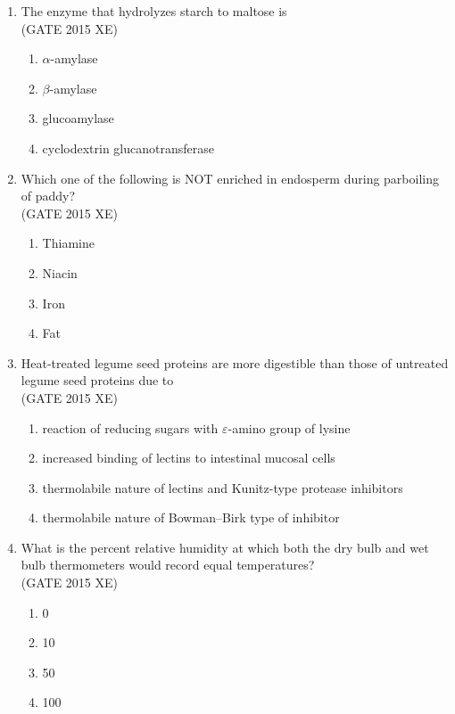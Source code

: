 \documentclass[journal,12pt,onecolumn]{IEEEtran}
\begin{document}
\begin{enumerate}
\item The enzyme that hydrolyzes starch to maltose is\\
\hfill{(GATE 2015 XE)} 
\begin{multicols}{4}
\begin{enumerate}
\item $\alpha$-amylase
\item $\beta$-amylase
\item glucoamylase
\item cyclodextrin glucanotransferase
\end{enumerate}
\end{multicols}

\item Which one of the following is NOT enriched in endosperm during parboiling of paddy?\\
\hfill{(GATE 2015 XE)} 
\begin{multicols}{4}
\begin{enumerate}
\item Thiamine
\item Niacin
\item Iron
\item Fat
\end{enumerate}
\end{multicols}


\item Heat-treated legume seed proteins are more digestible than those of untreated legume seed proteins due to\\
\hfill{(GATE 2015 XE)} 
\begin{multicols}{2}
\begin{enumerate}
\item reaction of reducing sugars with $\varepsilon$-amino group of lysine
\item increased binding of lectins to intestinal mucosal cells
\item thermolabile nature of lectins and Kunitz-type protease inhibitors
\item thermolabile nature of Bowman–Birk type of inhibitor
\end{enumerate}
\end{multicols}


\item What is the percent relative humidity at which both the dry bulb and wet bulb thermometers would record equal temperatures?\\
\hfill{(GATE 2015 XE)} 
\begin{multicols}{4}
\begin{enumerate}
\item 0
\item 10
\item 50
\item 100
\end{enumerate}
\end{multicols}


\end{enumerate}
\end{document}
